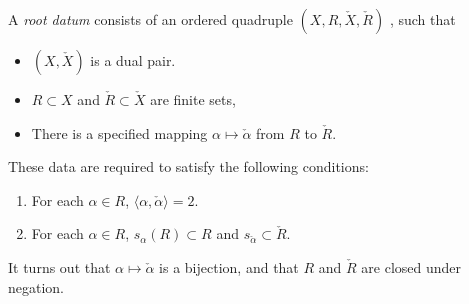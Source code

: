 \begin{definition}
A \emph{root datum} consists of an ordered quadruple $(X,R,\check X,\check R)$ , 
such that 
\begin{itemize}
  \item $(X,\check X)$ is a dual pair. 
  \item $R\subset X$ and $\check R\subset \check X$ are finite sets, 
  \item There is a specified mapping $\alpha\mapsto \check\alpha$ from $R$ to 
    $\check R$. 
\end{itemize}
These data are required to satisfy the following conditions:
\begin{enumerate}
  \item For each $\alpha\in R$, $\langle\alpha,\check\alpha\rangle=2$. 
  \item For each $\alpha\in R$, $s_\alpha(R)\subset R$ and 
    $s_{\check\alpha}\subset \check R$. 
\end{enumerate}
\end{definition}

It turns out that $\alpha\mapsto \check\alpha$ is a bijection, and that 
$R$ and $\check R$ are closed under negation. 




